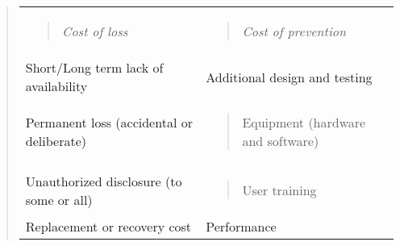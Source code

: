 \begin{quote}
\begin{longtable}[]{@{}ll@{}}
\toprule
\endhead
\begin{minipage}[t]{0.49\columnwidth}\raggedright
\begin{quote}
\emph{Cost of loss}
\end{quote}\strut
\end{minipage} & \begin{minipage}[t]{0.45\columnwidth}\raggedright
\begin{quote}
\emph{Cost of prevention}
\end{quote}\strut
\end{minipage}\tabularnewline
\begin{minipage}[t]{0.49\columnwidth}\raggedright
Short/Long term lack of availability\strut
\end{minipage} & \begin{minipage}[t]{0.45\columnwidth}\raggedright
Additional design and testing\strut
\end{minipage}\tabularnewline
\begin{minipage}[t]{0.49\columnwidth}\raggedright
Permanent loss (accidental or deliberate)\strut
\end{minipage} & \begin{minipage}[t]{0.45\columnwidth}\raggedright
\begin{quote}
Equipment (hardware and software)
\end{quote}\strut
\end{minipage}\tabularnewline
\begin{minipage}[t]{0.49\columnwidth}\raggedright
Unauthorized disclosure (to some or all)\strut
\end{minipage} & \begin{minipage}[t]{0.45\columnwidth}\raggedright
\begin{quote}
User training
\end{quote}\strut
\end{minipage}\tabularnewline
\begin{minipage}[t]{0.49\columnwidth}\raggedright
Replacement or recovery cost\strut
\end{minipage} & \begin{minipage}[t]{0.45\columnwidth}\raggedright
Performance\strut
\end{minipage}\tabularnewline
\bottomrule
\end{longtable}
\end{quote}

